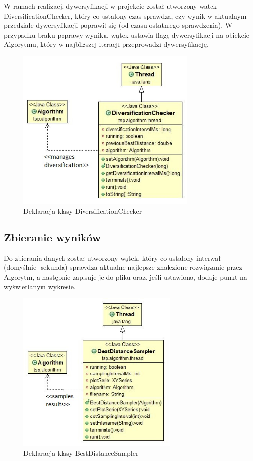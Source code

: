 \documentclass[a4paper,11pt]{article}
\begin{document}
W ramach realizacji dywersyfikacji w projekcie został utworzony watek DiversificationChecker, który co ustalony czas sprawdza, czy wynik w aktualnym przedziale dywersyfikacji poprawił się (od czasu ostatniego sprawdzenia). W przypadku braku poprawy wyniku, wątek ustawia flagę dywersyfikacji na obiekcie Algorytmu, który w najbliższej iteracji przeprowadzi dywersyfikację. 

\begin{figure}[H]
\centering
\includegraphics[height=8cm]{ClassDiversificationChecker.JPG}
\caption{Deklaracja klasy DiversificationChecker}
\end{figure}


\subsection{Zbieranie wyników}

Do zbierania danych został utworzony wątek, który co ustalony interwał (domyślnie- sekunda) sprawdza aktualne najlepsze znalezione rozwiązanie przez Algorytm, a następnie zapisuje je do pliku oraz, jeśli ustawiono, dodaje punkt na wyświetlanym wykresie.

\begin{figure}[H]
\centering
\includegraphics[height=8cm]{ClassBestDistanceSampler.JPG}
\caption{Deklaracja klasy BestDistanceSampler}
\end{figure}
\end{document}
